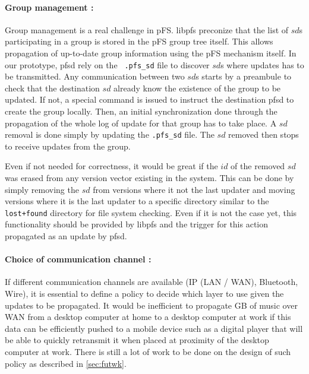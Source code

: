 \paragraph {Group management :}
Group management is a real challenge in pFS. libpfs preconize that the
list of $sd$s participating in a group is stored in the pFS group tree
itself. This allows propagation of up-to-date group information using
the pFS mechanism itself. In our prototype, pfsd rely on the {\tt
  .pfs\_sd} file to discover $sd$s where updates has to be
transmitted. Any communication between two $sd$s starts by a preambule
to check that the destination $sd$ already know the existence of the
group to be updated. If not, a special command is issued to instruct
the destination pfsd to create the group locally. Then, an initial
synchronization done through the propagation of the whole log of
update for that group has to take place. A $sd$ removal is done simply
by updating the {\tt .pfs\_sd} file. The $sd$ removed then stops to
receive updates from the group.

Even if not needed for correctness, it would be great if the $id$ of
the removed $sd$ was erased from any version vector existing in the
system. This can be done by simply removing the $sd$ from versions
where it not the last updater and moving versions where it is the last
updater to a specific directory similar to the {\tt lost+found} directory
for file system checking. Even if it is not the case yet, this
functionality should be provided by libpfs and the trigger for this
action propagated as an update by pfsd.

\paragraph {Choice of communication channel :}
If different communication channels are available (IP (LAN / WAN),
Bluetooth, Wire), it is essential to define a policy to decide which
layer to use given the updates to be propagated. It would be
inefficient to propagate GB of music over WAN from a desktop computer
at home to a desktop computer at work if this data can be efficiently
pushed to a mobile device such as a digital player that will be able
to quickly retransmit it when placed at proximity of the desktop
computer at work. There is still a lot of work to be done on the
design of such policy as described in \ref{sec:futwk}.



